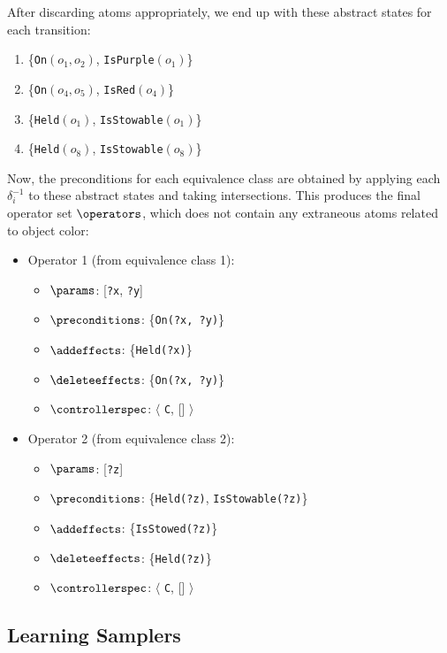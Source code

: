 After discarding atoms appropriately, we end up with these abstract states for each transition:
\begin{enumerate}
    \item \{\texttt{On}$(o_1, o_2)$, \texttt{IsPurple}$(o_{1})$\}
    \item \{\texttt{On}$(o_4, o_5)$, \texttt{IsRed}$(o_{4})$\}
    \item \{\texttt{Held}$(o_1)$, \texttt{IsStowable}$(o_1)$\}
    \item \{\texttt{Held}$(o_8)$, \texttt{IsStowable}$(o_8)$\}
\end{enumerate}

Now, the preconditions for each equivalence class are obtained by applying each $\delta_i^{-1}$ to these abstract states and taking intersections. This produces the final operator set $\operators$, which does not contain any extraneous atoms related to object color:

\begin{itemize}
    \item Operator 1 (from equivalence class 1):
    \begin{itemize}
    \item $\params$: [\texttt{?x}, \texttt{?y}]
    \item $\preconditions$: \{\texttt{On(?x, ?y)}\}
    \item $\addeffects$: \{\texttt{Held(?x)}\} \item $\deleteeffects$: \{\texttt{On(?x, ?y)}\} \item $\controllerspec$: $\langle$ \texttt{C}, [] $\rangle$
    \end{itemize}
    \item Operator 2 (from equivalence class 2):
    \begin{itemize}
    \item $\params$: [\texttt{?z}]
    \item $\preconditions$: \{\texttt{Held(?z)}, \texttt{IsStowable(?z)}\}
    \item $\addeffects$: \{\texttt{IsStowed(?z)}\} \item $\deleteeffects$: \{\texttt{Held(?z)}\} \item $\controllerspec$: $\langle$ \texttt{C}, [] $\rangle$
    \end{itemize}
\end{itemize}

\subsection{Learning Samplers}
\label{subsec:samplerlearning}

